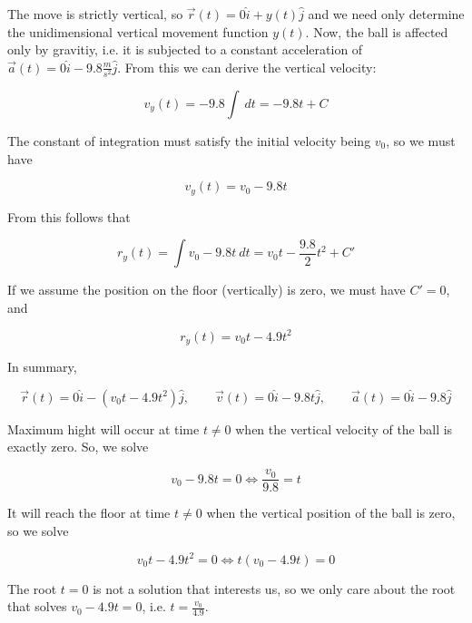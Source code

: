 \documentclass[12pt]{article}
\theoremstyle{definition}
\begin{document}
The move is strictly vertical, so $\vec{r}(t) = 0\hat{i} + y(t)\hat{j}$ and we
need only determine the unidimensional vertical movement function $y(t)$.
Now, the ball is affected only by gravitiy, i.e. it is subjected to a constant
acceleration of $\vec{a}(t) = 0\hat{i} -9.8 \frac{m}{s^2}\hat{j}$. From this we
can derive the vertical velocity: 

\begin{equation*}
    v_y(t) = -9.8 \int ~ dt = -9.8t + C
\end{equation*}

The constant of integration must satisfy the initial velocity being $v_0$, so we
must have  

\begin{equation*}
    v_y(t) = v_0 - 9.8t
\end{equation*}

From this follows that 

\begin{equation*}
    r_y(t) = \int v_0 - 9.8t ~ dt = v_0t - \frac{9.8}{2}t^2 + C'
\end{equation*}

If we assume the position on the floor (vertically) is zero, we must have 
$C' = 0$, and 

\begin{equation*}
    r_y(t) = v_0t - 4.9t^2
\end{equation*}

In summary, 

\begin{equation*}
    \vec{r}(t) = 0\hat{i} - (v_0t - 4.9t^2)\hat{j}, \qquad \vec{v}(t) = 0\hat{i}
    - 9.8t \hat{j}, \qquad \vec{a}(t) = 0 \hat{i} - 9.8 \hat{j}
\end{equation*}

Maximum hight will occur at time $t \neq 0$ when the vertical velocity of the
ball is exactly zero. So, we solve 

\begin{equation*}
    v_0 - 9.8t = 0 \iff \frac{v_0}{9.8} =t
\end{equation*}

It will reach the floor at time $t \neq 0$ when the vertical position of the
ball is zero, so we solve 

\begin{equation*}
    v_0 t - 4.9t^2 = 0 \iff t(v_0 - 4.9t) = 0
\end{equation*}

The root $t = 0$ is not a solution that interests us, so we only care about the
root that solves $v_0 - 4.9t = 0$, i.e. $t = \frac{v_0}{4.9}$.
\end{document}
